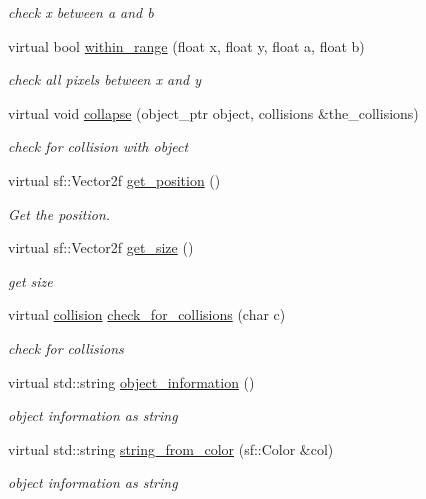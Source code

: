 \begin{DoxyCompactItemize}
\begin{DoxyCompactList}\small\item\em check x between a and b \end{DoxyCompactList}\item 
virtual bool \hyperlink{classdrawable_ab5c0e1af885f214bc9ef0da47cdb5ac9}{within\+\_\+range} (float x, float y, float a, float b)
\begin{DoxyCompactList}\small\item\em check all pixels between x and y \end{DoxyCompactList}\item 
virtual void \hyperlink{classdrawable_af0ddd3660d258629598dc76b31d1cc49}{collapse} (object\+\_\+ptr object, collisions \&the\+\_\+collisions)
\begin{DoxyCompactList}\small\item\em check for collision with object \end{DoxyCompactList}\item 
virtual sf\+::\+Vector2f \hyperlink{classdrawable_a6a31ea381be2964d0115b782a66d3414}{get\+\_\+position} ()
\begin{DoxyCompactList}\small\item\em Get the position. \end{DoxyCompactList}\item 
virtual sf\+::\+Vector2f \hyperlink{classdrawable_a58cb3ab0406d40e9cea3aefac1e4bf05}{get\+\_\+size} ()
\begin{DoxyCompactList}\small\item\em get size \end{DoxyCompactList}\item 
virtual \hyperlink{structcollision}{collision} \hyperlink{classdrawable_abbc6e0089d502ba48c3fcb9c96e3966e}{check\+\_\+for\+\_\+collisions} (char c)
\begin{DoxyCompactList}\small\item\em check for collisions \end{DoxyCompactList}\item 
virtual std\+::string \hyperlink{classdrawable_a2ed0f8bb53f33477f7722efa7bb24583}{object\+\_\+information} ()
\begin{DoxyCompactList}\small\item\em object information as string \end{DoxyCompactList}\item 
virtual std\+::string \hyperlink{classdrawable_add3d8569fe2616ae0ed503b19c92c08e}{string\+\_\+from\+\_\+color} (sf\+::\+Color \&col)
\begin{DoxyCompactList}\small\item\em object information as string \end{DoxyCompactList}\end{DoxyCompactItemize}

